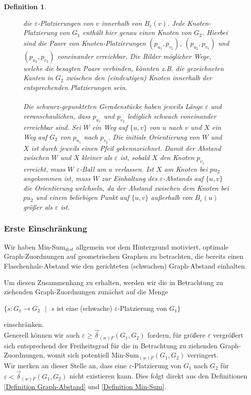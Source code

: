 \documentclass[a4paper, 12pt, twoside]{article}
\theoremstyle{Format1} %
\newtheorem{Def}{Definition}[section]       %
\begin{document}
\begin{Def}
\begin{figure}[htpb]
{		die $\varepsilon$-Platzierungen von $v$ innerhalb von $B_{\varepsilon}(v)$. Jede Knoten-Platzierung von $G_1$ enthält hier genau einen Knoten von $G_2$.
		Hierbei sind die Paare von Knoten-Platzierungen
		$(p_{u_1},p_{v_1})$, $(p_{u_2},p_{v_1})$ und $(p_{u_2},p_{v_2})$ voneinander erreichbar. Die Bilder möglicher Wege, welche die besagten Paare verbinden, könnten z.B. die
		gezeichneten Kanten in $G_2$ zwischen den (eindeutigen) Knoten innerhalb der entsprechenden Platzierungen sein.
		\\
		\\
		Die schwarz-gepunkteten Geradenstücke haben jeweils Länge $\varepsilon$ und veranschaulichen, dass $p_{u_1}$ und $p_{v_2}$ lediglich schwach voneinander erreichbar sind.
		Sei $W$ ein Weg auf $\{u,v\}$ von $u$ nach $v$ und $X$ ein Weg auf $G_2$ von $p_{u_1}$ nach $p_{v_2}$. Die initiale Orientierung von $W$ und $X$ ist durch jeweils einen Pfeil gekennzeichnet.
		Damit der Abstand zwischen $W$ und $X$ kleiner als $\varepsilon$ ist, sobald $X$ den Knoten $p_{v_1}$ erreicht,
		muss $W$ $\varepsilon$-Ball um $u$ verlassen. Ist $X$ am Knoten bei $p{u_2}$ angekommen ist, muss $W$ zur Einhaltung des $\varepsilon$-Abstands auf $\{u,v\}$ die Orientierung welchseln, da
		der Abstand zwischen dem Knoten bei $p{u_2}$ und einem beliebigen Punkt auf $\{u,v\}$ außerhalb von $B_{\varepsilon}(u)$ größer als $\varepsilon$ ist.}
	    \label{chapter_3_placements_example}
	\end{figure}
\end{Def}

\subsubsection{Erste Einschränkung} \label{Erste Einschränkung}

Wir haben Min-Sum$_{dist}$ allgemein vor dem Hintergrund motiviert, optimale Graph-Zuordnungen auf geometrischen Graphen zu betrachten,
die bereits einen Flaschenhals-Abstand wie den gerichteten (schwachen) Graph-Abstand einhalten.

Um diesen Zusammenhang zu erhalten, werden wir die in Betrachtung zu ziehenden Graph-Zuordnungen zunächst auf die Menge
\begin{center}
	$\{s: G_1 \to G_2 \text{ $|$ } s$ ist eine (schwache) $\varepsilon$-Platzierung von $G_1 \}$
\end{center}
einschränken.
\\
Generell können wir auch $\varepsilon \geq \vec{\delta}_{(w)F}(G_1, G_2)$ fordern, für größere $\varepsilon$ vergrößert sich entsprechend der Freiheitsgrad für die
in Betrachtung zu ziehenden Graph-Zuordnungen, womit sich potentiell Min-Sum$_{(w)F}(G_1, G_2)$ verringert.
\\
Wir merken an dieser Stelle an, dass eine $\varepsilon$-Platzierung von $G_1$ nach $G_2$ für $\varepsilon < \vec{\delta}_{(w)F}(G_1,G_2)$
nicht existieren kann. Dies folgt direkt aus den Definitionen \ref{Definition Graph-Abstand} und \ref{Definition Min-Sum}.
\end{document}
